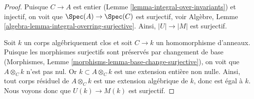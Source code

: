 \begin{proof}
Puisque $C \to A$ est entier (Lemme \ref{lemma-integral-over-invariants})
et injectif, on voit que $\Spec(A) \to \Spec(C)$ est surjectif, voir
Algèbre, Lemme \ref{algebra-lemma-integral-overring-surjective}.
Ainsi, $|U| \to |M|$ est surjectif.

\medskip\noindent
Soit $k$ un corps algébriquement clos et soit $C \to k$ un homomorphisme d'anneaux.
Puisque les morphismes surjectifs sont préservés par changement de base
(Morphismes, Lemme \ref{morphisms-lemma-base-change-surjective}),
on voit que $A \otimes_C k$ n'est pas nul. Or $k \subset A \otimes_C k$ est une
extension entière non nulle. Ainsi, tout corps résiduel de $A \otimes_C k$
est une extension algébrique de $k$, donc est égal à $k$. Nous voyons donc que
$U(k) \to M(k)$ est surjectif.


\end{proof}
